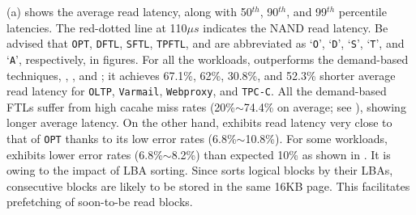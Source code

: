 (a) shows the average read latency, 
along with 50$^{th}$, 90$^{th}$, and 99$^{th}$ percentile latencies.
The red-dotted line at 110$\mu s$ indicates the
NAND read latency.  
Be advised that 
\texttt{OPT}, \texttt{DFTL}, \texttt{SFTL}, \texttt{TPFTL}, and \texttt{\ours{}}
are abbreviated as `\texttt{O}', `\texttt{D}', `\texttt{S}', `\texttt{T}', and `\texttt{A}', respectively, in figures.
For all the workloads, \OURS{} outperforms the demand-based
techniques, \DFTL{}, \SFTL{}, and \TPFTL{}; it achieves 67.1\%, 62\%, 30.8\%,
and 52.3\% shorter average read latency for \texttt{OLTP}, \texttt{Varmail},
\texttt{Webproxy}, and \texttt{TPC-C}.  All the demand-based FTLs suffer from
high cacahe miss rates (20\%$\sim$74.4\% on average; see ), showing longer
average latency.
On the other hand, \OURS{} exhibits read latency very close to that of
\texttt{OPT} thanks to its low error rates (6.8\%$\sim$10.8\%). For 
some workloads, \OURS{} exhibits lower error rates (6.8\%$\sim$8.2\%) than
expected 10\% as shown in .  
It is owing to the impact of LBA sorting.  Since \ours{} sorts logical
blocks by their LBAs, consecutive blocks are likely to be stored in the same 16KB
page.  This facilitates prefetching of soon-to-be read blocks.

